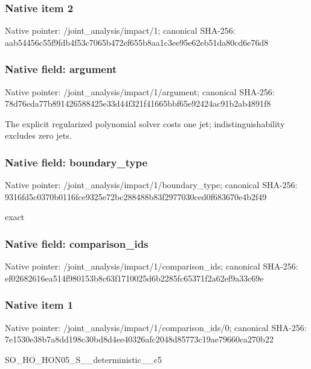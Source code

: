 \documentclass[10pt,a4paper]{article}
\begin{document}
\subsubsection{Native item 2}
Native pointer: /joint\_\allowbreak{}analysis/impact/1; canonical SHA-256: aab54456c55f9fdb4f53c7065b472ef655b8aa1c3ee95e62eb51da80cd6e76d8

\subsubsection{Native field: argument}
Native pointer: /joint\_\allowbreak{}analysis/impact/1/argument; canonical SHA-256: 78d76eda77b891426588425e33d44f321f41665bbf65e92424ac91b2ab4891f8

\begingroup\raggedright\sloppy The explicit regularized polynomial solver costs one jet;\allowbreak{} indistinguishability excludes zero jets.\par\endgroup

\subsubsection{Native field: boundary\_\allowbreak{}type}
Native pointer: /joint\_\allowbreak{}analysis/impact/1/boundary\_\allowbreak{}type; canonical SHA-256: 9316fd5c0370b0116fce9325e72bc288488b83f2977030ced0f683670e4b2f49

\begingroup\raggedright\sloppy exact\par\endgroup

\subsubsection{Native field: comparison\_\allowbreak{}ids}
Native pointer: /joint\_\allowbreak{}analysis/impact/1/comparison\_\allowbreak{}ids; canonical SHA-256: ef02682616ea514f980153b8c63f1710025d6b2285fc65371f2a62ef9a33c69e

\subsubsection{Native item 1}
Native pointer: /joint\_\allowbreak{}analysis/impact/1/comparison\_\allowbreak{}ids/0; canonical SHA-256: 7e1530e38b7a8dd198c30bd8d4ee40326afc2048d85773c19ae79660ca270b22

\begingroup\raggedright\sloppy SO\_\allowbreak{}HO\_\allowbreak{}HON05\_\allowbreak{}S\_\allowbreak{}\_\allowbreak{}deterministic\_\allowbreak{}\_\allowbreak{}c5\par\endgroup
\end{document}
